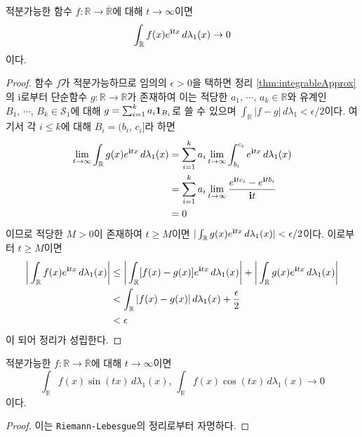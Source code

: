 \begin{theorem}
    적분가능한 함수 $f:\mathbb{R}\to\overline{\mathbb{R}}$에 대해 $ t\to\infty$이면
    \begin{equation*}
        \int_{\mathbb{R}}f(x)e^{\mathbf{i} t x}\,d\lambda_1(x)\to0
    \end{equation*}
    이다.
\end{theorem}

\begin{proof}
    함수 $f$가 적분가능하므로 임의의 $\epsilon>0$을 택하면 정리 \ref{thm:integrableApprox}의 i로부터 단순함수 $g:\mathbb{R}\to\mathbb{R}$가 존재하여 이는 적당한 $a_1,\,\cdots,\,a_k\in\mathbb{R}$와 유계인 $B_1,\,\cdots,\,B_k\in\mathcal{S}_1$에 대해 $g=\sum_{i=1}^ka_i\mathbf{1}_{B_i}$로 쓸 수 있으며 $\int_{\mathbb{R}}|f-g|\,d\lambda_1<\epsilon/2$이다. 여기서 각 $i\leq k$에 대해 $B_i=(b_i,\,c_i]$라 하면
    \begin{align*}
        \lim_{ t\to\infty}\int_{\mathbb{R}}g(x)e^{\mathbf{i} t x}\,d\lambda_1(x)&=\sum_{i=1}^ka_i\lim_{ t\to\infty}\int_{b_i}^{c_i}e^{\mathbf{i} t x}\,d\lambda_1(x)\\
        &=\sum_{i=1}^ka_i\lim_{ t\to\infty}\frac{e^{\mathbf{i} t c_i}-e^{\mathbf{i} t b_i}}{\mathbf{i} t}\\
        &=0
    \end{align*}
    이므로 적당한 $M>0$이 존재하여 $ t\geq M$이면 $|\int_{\mathbb{R}}g(x)e^{\mathbf{i} t x}\,d\lambda_1(x)|<\epsilon/2$이다. 이로부터 $ t\geq M$이면
    \begin{align*}
        \bigg|\int_{\mathbb{R}}f(x)e^{\mathbf{i} t x}\,d\lambda_1(x)\bigg|&\leq\bigg|\int_{\mathbb{R}}[f(x)-g(x)]e^{\mathbf{i} t x}\,d\lambda_1(x)\bigg|+\bigg|\int_{\mathbb{R}}g(x)e^{\mathbf{i} t x}\,d\lambda_1(x)\bigg|\\
        &<\int_{\mathbb{R}}|f(x)-g(x)|\,d\lambda_1(x)+\frac{\epsilon}{2}\\
        &<\epsilon
    \end{align*}
    이 되어 정리가 성립한다.
\end{proof}

\begin{corollary}
    적분가능한 $f:\mathbb{R}\to\overline{\mathbb{R}}$에 대해 $ t\to\infty$이면
    \begin{equation*}
        \int_{\mathbb{R}}f(x)\sin( t x)\,d\lambda_1(x),\,\int_{\mathbb{R}}f(x)\cos( t x)\,d\lambda_1(x)\to0
    \end{equation*}
    이다.
\end{corollary}

\begin{proof}
    이는 \texttt{Riemann-Lebesgue}의 정리로부터 자명하다.
\end{proof}

